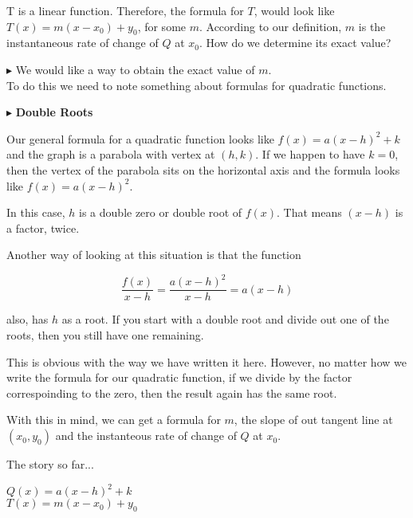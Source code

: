 \documentclass{ximera}
\begin{document}
T is a linear function. Therefore, the formula for $T$, would look like $T(x) = m(x - x_0) + y_0$, for some $m$.  According to our definition, $m$ is the instantaneous rate of change of $Q$ at $x_0$.  How do we determine its exact value?



$\blacktriangleright$ We would like a way to obtain the exact value of $m$. \\


To do this we need to note something about formulas for quadratic functions.


$\blacktriangleright$ \textbf{\textcolor{purple!85!blue}{Double Roots}} 

Our general formula for a quadratic function looks like  $f(x) = a (x - h)^2 + k$ and the graph is a parabola with vertex at $(h, k)$. If we happen to have $k = 0$, then the vertex of the parabola sits on the horizontal axis and the formula looks like $f(x) = a (x - h)^2$.


In this case, $h$ is a double zero or double root of $f(x)$.  That means $(x - h)$ is a factor, twice.


Another way of looking at this situation is that the function


\[
\frac{f(x)}{x-h} = \frac{a (x - h)^2}{x - h} = a (x - h)
\]


also, has $h$ as a root.  If you start with a double root and divide out one of the roots, then you still have one remaining.

This is obvious with the way we have written it here.  However, no matter how we write the formula for our quadratic function, if we divide by the factor correspoinding to the zero, then the result again has the same root.


With this in mind, we can get a formula for $m$, the slope of out tangent line at $(x_0, y_0)$ and the instanteous rate of change of $Q$ at $x_0$.






The story so far...

$Q(x) = a (x - h)^2 + k$ \\

$T(x) = m(x - x_0) + y_0$ \\
\end{document}
